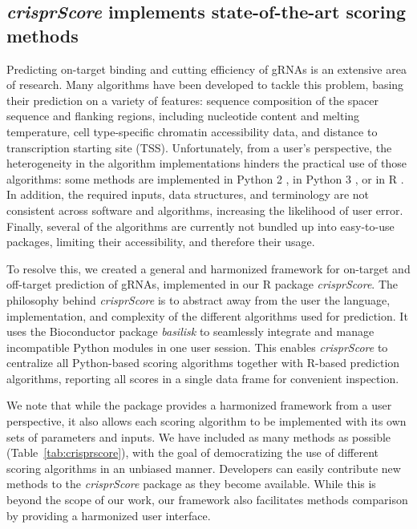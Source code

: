 \documentclass[pdftex,english,10pt]{article}
\begin{document}
\subsection{\textit{crisprScore} implements state-of-the-art scoring methods}

Predicting on-target binding and cutting efficiency of gRNAs is an extensive area of research. Many algorithms have been developed to tackle this problem, basing their prediction on a variety of features: sequence composition of the spacer sequence and flanking regions, including nucleotide content and melting temperature, cell type-specific chromatin accessibility data, and distance to transcription starting site (TSS).  Unfortunately, from a user's perspective, the heterogeneity in the algorithm implementations hinders the practical use of those algorithms: some methods are implemented in Python 2 \citep{azimuth,deepcpf1}, in Python 3 \citep{lindel,deepcas9,enpamgb}, or in R  \citep{doench2014rational,wessels2020massively,crisprscan}. In addition, the required inputs, data structures, and terminology are not consistent across software and algorithms, increasing the likelihood of user error. Finally, several of the algorithms are currently not bundled up into easy-to-use packages, limiting their accessibility, and therefore their usage.

To resolve this, we created a general and harmonized framework for on-target and off-target prediction of gRNAs, implemented in our R package \textit{crisprScore}. The philosophy behind \textit{crisprScore} is to abstract away from the user the language, implementation, and complexity of the different algorithms used for prediction.  It uses the Bioconductor package \textit{basilisk} \citep{basilisk} to seamlessly integrate and manage incompatible Python modules in one user session. This enables \textit{crisprScore} to centralize all Python-based scoring algorithms together with R-based prediction algorithms, reporting all scores in a single data frame for convenient inspection. 

We note that while the package provides a harmonized framework from a user perspective, it also allows each scoring algorithm to be implemented with its own sets of parameters and inputs. We have included as many methods as possible (Table~\ref{tab:crisprscore}), with the goal of democratizing the use of different scoring algorithms in an unbiased manner. Developers can easily contribute new methods to the \textit{crisprScore} package as they become available. While this is beyond the scope of our work, our framework also facilitates methods comparison by providing a harmonized user interface. 
\end{document}
